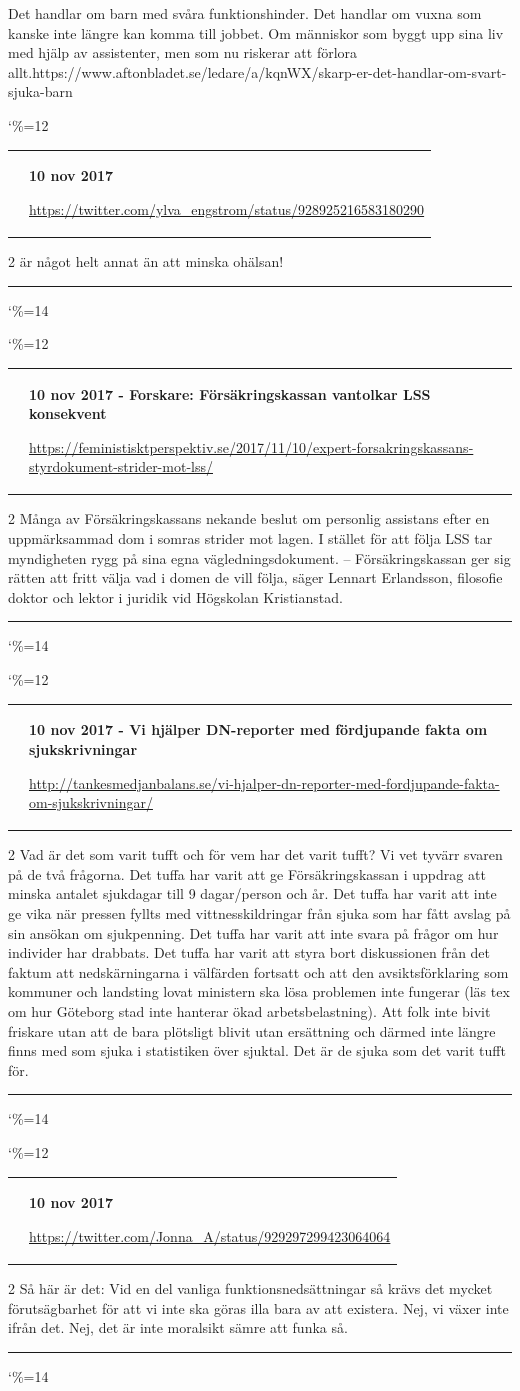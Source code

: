 \documentclass[a4paper]{article}
\makeatletter
\newcommand{\entry}{
\catcode`\%=12
\@entry}
\newcommand{\@entry}[3]{
\bigskip
\begin{tabular*}{\textwidth}{l m{\textwidth-4cm}}
\qrcode{#3} & \textbf{#1}

\medskip

\url{#3}

\end{tabular*}

\medskip


\begin{multicols}{2}
#2
\end{multicols}

\medskip
\hrule

\catcode`\%=14
}
\makeatother
\begin{document}
{{{{Det handlar om barn med svåra funktionshinder. Det handlar om vuxna som kanske inte längre kan komma till jobbet. Om människor som byggt upp sina liv med hjälp av assistenter, men som nu riskerar att förlora allt.}{https://www.aftonbladet.se/ledare/a/kqnWX/skarp-er-det-handlar-om-svart-sjuka-barn}

\entry{10 nov 2017}{ är något helt annat än att minska ohälsan!}{https://twitter.com/ylva_engstrom/status/928925216583180290}

\entry{10 nov 2017 - Forskare: Försäkringskassan vantolkar LSS konsekvent}{Många av Försäkringskassans nekande beslut om personlig assistans efter en uppmärksammad dom i somras strider mot lagen. I stället för att följa LSS tar myndigheten rygg på sina egna vägledningsdokument.
– Försäkringskassan ger sig rätten att fritt välja vad i domen de vill följa, säger Lennart Erlandsson, filosofie doktor och lektor i juridik vid Högskolan Kristianstad.}{https://feministisktperspektiv.se/2017/11/10/expert-forsakringskassans-styrdokument-strider-mot-lss/}

\entry{10 nov 2017 - Vi hjälper DN-reporter med fördjupande fakta om sjukskrivningar}{Vad är det som varit tufft och för vem har det varit tufft? Vi vet tyvärr svaren på de två frågorna. Det tuffa har varit att ge Försäkringskassan i uppdrag att minska antalet sjukdagar till 9 dagar/person och år. Det tuffa har varit att inte ge vika när pressen fyllts med vittnesskildringar från sjuka som har fått avslag på sin ansökan om sjukpenning. Det tuffa har varit att inte svara på frågor om hur individer har drabbats. Det tuffa har varit att styra bort diskussionen från det faktum att nedskärningarna i välfärden fortsatt och att den avsiktsförklaring som kommuner och landsting lovat ministern ska lösa problemen inte fungerar (läs tex om hur Göteborg stad inte hanterar ökad arbetsbelastning). Att folk inte bivit friskare utan att de bara plötsligt blivit utan ersättning och därmed inte längre finns med som sjuka i statistiken över sjuktal. Det är de sjuka som det varit tufft för.}{http://tankesmedjanbalans.se/vi-hjalper-dn-reporter-med-fordjupande-fakta-om-sjukskrivningar/}

\entry{10 nov 2017}{Så här är det: Vid en del vanliga funktionsnedsättningar så krävs det mycket förutsägbarhet för att vi inte ska göras illa bara av att existera. Nej, vi växer inte ifrån det. Nej, det är inte moralsikt sämre att funka så.}{https://twitter.com/Jonna_A/status/929297299423064064}


}}}
\end{document}
